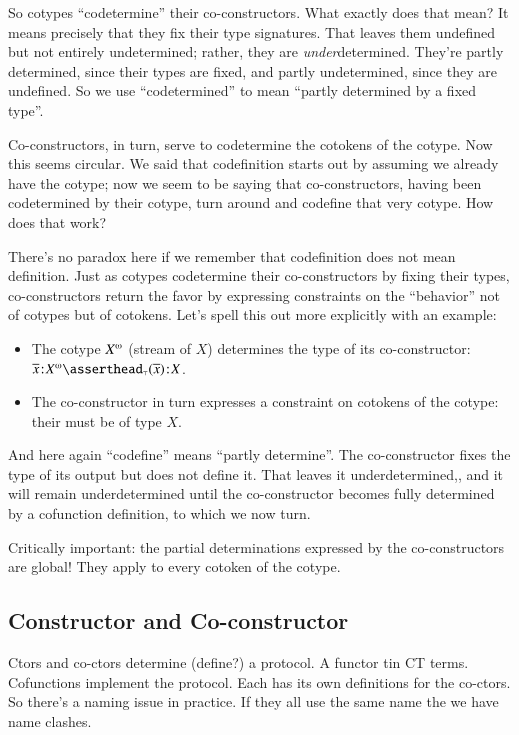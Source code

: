 So cotypes ``codetermine'' their co-constructors. What exactly does
that mean? It means precisely that they fix their type signatures.
That leaves them undefined but not entirely undetermined; rather, they
are \textit{under}determined. They're partly determined, since their
types are fixed, and partly undetermined, since they are undefined. So
we use ``codetermined'' to mean ``partly determined by a fixed
type''.

Co-constructors, in turn, serve to codetermine the cotokens of the
cotype. Now this seems circular. We said that codefinition starts out
by assuming we already have the cotype; now we seem to be saying that
co-constructors, having been codetermined by their cotype, turn around
and codefine that very cotype. How does that work?

There's no paradox here if we remember that codefinition does not mean
definition. Just as cotypes codetermine their co-constructors by
fixing their types, co-constructors return the favor by expressing
constraints on the ``behavior'' not of cotypes but of cotokens. Let's spell this out more explicitly with an example:

\begin{itemize}
\item The cotype \(\colist{X}\) (stream of \(X\)) determines the type of
  its \cohead{} co-constructor:
  \(\tj{\cotok{x}}{\colist{X}}\linfer\tj{\cohead(\cotok{x})}{X}\).
  \item The co-constructor in turn expresses a constraint on cotokens
    of the cotype: their \cohead{} must be of type \(X\).
\end{itemize}

And here again ``codefine'' means ``partly determine''. The
co-constructor fixes the type of its output but does not define it.
That leaves it underdetermined,, and it will remain underdetermined
until the co-constructor becomes fully determined by a cofunction
definition, to which we now turn.

Critically important: the partial determinations expressed by the
co-constructors are global! They apply to every cotoken of the cotype.

\subsection{Constructor and Co-constructor}

Ctors and co-ctors determine (define?) a protocol. A functor tin CT
terms. Cofunctions implement the protocol. Each has its own
definitions for the co-ctors. So there's a naming issue in practice.
If they all use the same name the we have name clashes.

